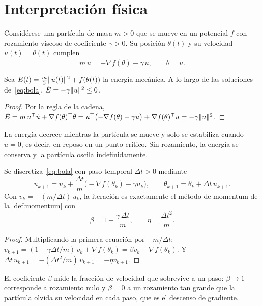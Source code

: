 \section{Interpretación física}

Considérese una partícula de masa $m>0$ que se mueve en un potencial $f$ con rozamiento viscoso de coeficiente $\gamma>0$. Su posición $\theta(t)$ y su velocidad $u(t)=\dot\theta(t)$ cumplen
\begin{equation}\label{eq:bola}
m\,\dot u=-\nabla f(\theta)-\gamma\,u,\qquad\dot\theta=u.
\end{equation}

\begin{proposicion}\label{prop:energia}
Sea $E(t)=\frac{m}{2}\lVert u(t)\rVert^{2}+f(\theta(t))$ la energía mecánica. A lo largo de las soluciones de~\eqref{eq:bola}, $\dot E=-\gamma\lVert u\rVert^{2}\le 0$.
\end{proposicion}

\begin{proof}
Por la regla de la cadena, $\dot E=m\,u^{\top}\dot u+\nabla f(\theta)^{\top}\dot\theta=u^{\top}\bigl(-\nabla f(\theta)-\gamma u\bigr)+\nabla f(\theta)^{\top} u=-\gamma\lVert u\rVert^{2}$.
\end{proof}

La energía decrece mientras la partícula se mueve y solo se estabiliza cuando $u=0$, es decir, en reposo en un punto crítico. Sin rozamiento, la energía se conserva y la partícula oscila indefinidamente.

\begin{proposicion}[Discretización]\label{prop:discretizacion}
Se discretiza~\eqref{eq:bola} con paso temporal $\Delta t>0$ mediante
\[
u_{k+1}=u_k+\frac{\Delta t}{m}\bigl(-\nabla f(\theta_k)-\gamma u_k\bigr),\qquad\theta_{k+1}=\theta_k+\Delta t\,u_{k+1}.
\]
Con $v_k=-(m/\Delta t)\,u_k$, la iteración es exactamente el método de momentum de la \cref{def:momentum} con
\[
\beta=1-\frac{\gamma\,\Delta t}{m},\qquad\eta=\frac{\Delta t^{2}}{m}.
\]
\end{proposicion}

\begin{proof}
Multiplicando la primera ecuación por $-m/\Delta t$: $v_{k+1}=(1-\gamma\Delta t/m)\,v_k+\nabla f(\theta_k)=\beta v_k+\nabla f(\theta_k)$. Y $\Delta t\,u_{k+1}=-(\Delta t^{2}/m)\,v_{k+1}=-\eta v_{k+1}$.
\end{proof}

El coeficiente $\beta$ mide la fracción de velocidad que sobrevive a un paso: $\beta\to 1$ corresponde a rozamiento nulo y $\beta=0$ a un rozamiento tan grande que la partícula olvida su velocidad en cada paso, que es el descenso de gradiente.

